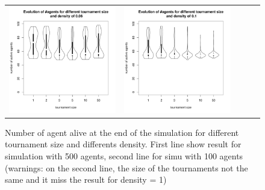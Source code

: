 \documentclass[a4paper]{article}
\begin{document}
\begin{figure}
\begin{tabular}[H]{lcccc}
	\includegraphics[width=.25\textwidth]{img/100/agentwrtK_D-0060.pdf} &
	\includegraphics[width=.25\textwidth]{img/100/agentwrtK_D-0100.pdf} &
    \end{tabular}
    \caption{Number of agent alive at the end of the simulation for different tournament size and differents density. First line show result for simulation with 500 agents, second line for simu with 100 agents (warnings: on the second line, the size of the tournaments not the same and it miss the result for density = 1)}
\end{figure}

\pagebreak
\end{document}
